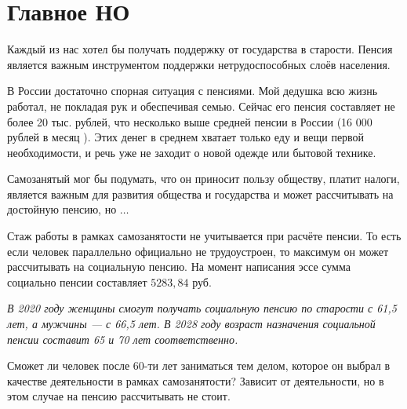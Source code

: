 \section{Главное НО}

Каждый из нас хотел бы получать поддержку
от государства в старости. 
Пенсия является важным инструментом поддержки 
нетрудоспособных слоёв населения.

В России достаточно спорная ситуация с пенсиями.
Мой дедушка всю жизнь работал, не покладая рук 
и обеспечивая семью. Сейчас его пенсия составляет 
не более 20 тыс. рублей, что несколько выше средней пенсии 
в России (16 000 рублей в месяц \cite{mid-pens}). 
Этих денег в среднем хватает только еду
и вещи первой необходимости, и речь уже не заходит 
о новой одежде или бытовой технике.

Самозанятый мог бы подумать, что он приносит пользу обществу,
платит налоги, является важным для развития общества и государства
и может рассчитывать на достойную пенсию, но $\ldots$

Стаж работы в рамках самозанятости не учитывается при расчёте пенсии.
То есть если человек параллельно официально не трудоустроен, то
максимум он может рассчитывать на социальную пенсию. 
На момент написания эссе сумма социально пенсии составляет $ 5283,84 $ руб. \cite{pens-quote}

\begin{displayquote}
	\textit{
		В 2020 году женщины смогут получать социальную пенсию по старости с 61,5 лет, а мужчины — с 66,5 лет. В 2028 году возраст назначения социальной пенсии составит 65 и 70 лет соответственно.
	}
\end{displayquote}

Сможет ли человек после 60-ти лет заниматься тем делом,
которое он выбрал в качестве деятельности в рамках самозанятости?
Зависит от деятельности, но в этом случае на пенсию рассчитывать не стоит.